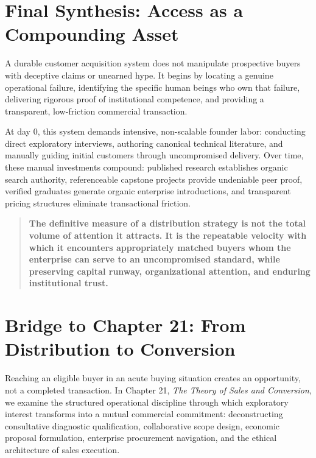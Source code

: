 \section*{Final Synthesis: Access as a Compounding Asset}

A durable customer acquisition system does not manipulate prospective buyers with deceptive claims or unearned hype. It begins by locating a genuine operational failure, identifying the specific human beings who own that failure, delivering rigorous proof of institutional competence, and providing a transparent, low-friction commercial transaction.

At day 0, this system demands intensive, non-scalable founder labor: conducting direct exploratory interviews, authoring canonical technical literature, and manually guiding initial customers through uncompromised delivery. Over time, these manual investments compound: published research establishes organic search authority, referenceable capstone projects provide undeniable peer proof, verified graduates generate organic enterprise introductions, and transparent pricing structures eliminate transactional friction.

\begin{quote}
\textbf{The definitive measure of a distribution strategy is not the total volume of attention it attracts. It is the repeatable velocity with which it encounters appropriately matched buyers whom the enterprise can serve to an uncompromised standard, while preserving capital runway, organizational attention, and enduring institutional trust.}
\end{quote}

\vspace{4pt}

\section*{Bridge to Chapter 21: From Distribution to Conversion}

Reaching an eligible buyer in an acute buying situation creates an opportunity, not a completed transaction. In Chapter 21, \textit{The Theory of Sales and Conversion}, we examine the structured operational discipline through which exploratory interest transforms into a mutual commercial commitment: deconstructing consultative diagnostic qualification, collaborative scope design, economic proposal formulation, enterprise procurement navigation, and the ethical architecture of sales execution.
